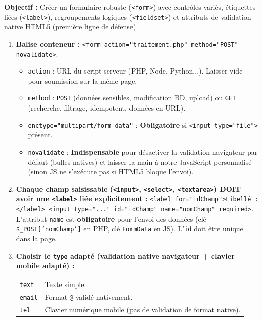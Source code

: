 \documentclass[11pt]{article}
\begin{document}
\begin{methode}
    \textbf{Objectif :} Créer un formulaire robuste (\texttt{<form>}) avec contrôles variés, étiquettes liées (\texttt{<label>}), regroupements logiques (\texttt{<fieldset>}) et attributs de validation native HTML5 (première ligne de défense).
    \begin{enumerate}
        \item \textbf{Balise conteneur :} \texttt{<form action="traitement.php" method="POST" novalidate>}.
              \begin{itemize}
                  \item \texttt{action} : URL du script serveur (PHP, Node, Python...). Laisser vide pour soumission sur la même page.
                  \item \texttt{method} : \texttt{POST} (données sensibles, modification BD, upload) ou \texttt{GET} (recherche, filtrage, idempotent, données en URL).
                  \item \texttt{enctype="multipart/form-data"} : \textbf{Obligatoire} si \texttt{<input type="file">} présent.
                  \item \texttt{novalidate} : \textbf{Indispensable} pour désactiver la validation navigateur par défaut (bulles natives) et laisser la main à notre JavaScript personnalisé (sinon JS ne s'exécute pas si HTML5 bloque l'envoi).
              \end{itemize}
        \item \textbf{Chaque champ saisissable (\texttt{<input>}, \texttt{<select>}, \texttt{<textarea>}) DOIT avoir une \texttt{<label>} liée explicitement :}
              \texttt{<label for="idChamp">Libellé :</label> <input type="..." id="idChamp" name="nomChamp" required>}.
              L'attribut \texttt{name} est \textbf{obligatoire} pour l'envoi des données (clé \texttt{\$\_POST['nomChamp']} en PHP, clé \texttt{FormData} en JS). L'\texttt{id} doit être unique dans la page.
        \item \textbf{Choisir le \texttt{type} adapté (validation native navigateur + clavier mobile adapté) :}
              \begin{tabularx}{\linewidth}{@{}lX@{}}
                  \texttt{text} & Texte simple. \\
                  \texttt{email} & Format \texttt{@} validé nativement. \\
                  \texttt{tel} & Clavier numérique mobile (pas de validation de format native). \\

\end{tabularx}
\end{enumerate}
\end{methode}
\end{document}
